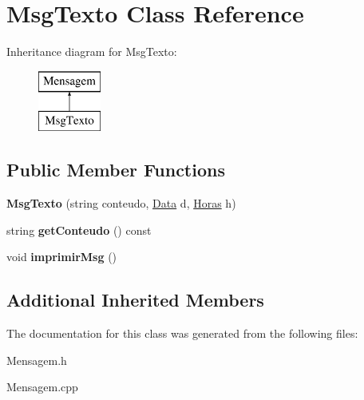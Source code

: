 \hypertarget{class_msg_texto}{}\section{Msg\+Texto Class Reference}
\label{class_msg_texto}
Inheritance diagram for Msg\+Texto\+:\begin{figure}[H]
\begin{center}
\leavevmode
\includegraphics[height=2.000000cm]{class_msg_texto}
\end{center}
\end{figure}
\subsection*{Public Member Functions}
\begin{DoxyCompactItemize}
\item 
\hypertarget{class_msg_texto_a8ad133274a0f20954695cd2b2c619595}{}{\bfseries Msg\+Texto} (string conteudo, \hyperlink{class_data}{Data} d, \hyperlink{class_horas}{Horas} h)\label{class_msg_texto_a8ad133274a0f20954695cd2b2c619595}

\item 
\hypertarget{class_msg_texto_a9743e624bf980d9b4ed0db65a947f203}{}string {\bfseries get\+Conteudo} () const \label{class_msg_texto_a9743e624bf980d9b4ed0db65a947f203}

\item 
\hypertarget{class_msg_texto_ac621ebd05f2c55fcfe9746ff402ab26b}{}void {\bfseries imprimir\+Msg} ()\label{class_msg_texto_ac621ebd05f2c55fcfe9746ff402ab26b}

\end{DoxyCompactItemize}
\subsection*{Additional Inherited Members}


The documentation for this class was generated from the following files\+:\begin{DoxyCompactItemize}
\item 
Mensagem.\+h\item 
Mensagem.\+cpp\end{DoxyCompactItemize}
